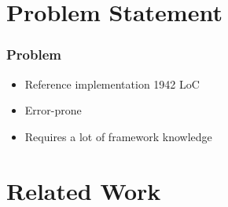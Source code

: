 \section{Problem Statement}


\begin{frame}
  \frametitle{Problem}
  \begin{itemize}
    \setlength\itemsep{.5cm}
    \item Reference implementation 1942 LoC
    \item Error-prone
    \item Requires a lot of framework knowledge
  \end{itemize}



\end{frame}






\begin{frame}
  \centering
  \hspace{-1cm}
  \huge
\end{frame}

\section{Related Work}
\begin{frame}
  \centering
  \hspace{-1cm}
  \huge
\end{frame}


